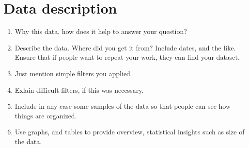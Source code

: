 \documentclass[report]{subfiles}
\begin{document}
\section{Data description}
\label{sec:data-description}

\begin{enumerate}
\item Why this data, how does it help to answer your question?
\item Describe the data. Where did you get it from? Include dates, and the like. Ensure that if people want to repeat your work, they can find your dataset.
\item Just mention simple filters you applied
\item Exlain difficult filters, if this was necessary.
\item Include in any case some samples of the data so that people can see how things are organized.
\item Use graphs, and tables to provide overview, statistical insights such as size of the data.
\end{enumerate}
\end{document}
